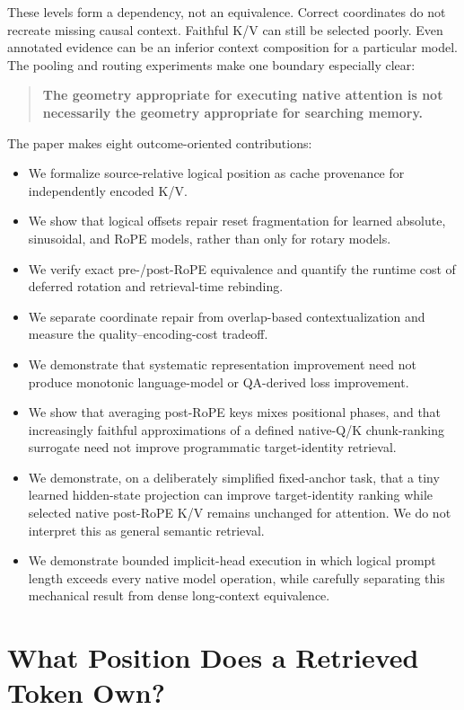 \documentclass[11pt]{article}
\begin{document}
These levels form a dependency, not an equivalence. Correct coordinates do not recreate
missing causal context. Faithful K/V can still be selected poorly. Even annotated evidence
can be an inferior context composition for a particular model. The pooling and routing
experiments make one boundary especially clear:

\begin{quote}
\textbf{The geometry appropriate for executing native attention is not necessarily the
geometry appropriate for searching memory.}
\end{quote}

The paper makes eight outcome-oriented contributions:
\begin{itemize}[leftmargin=*]
\item We formalize source-relative logical position as cache provenance for independently
encoded K/V.
\item We show that logical offsets repair reset fragmentation for learned absolute,
sinusoidal, and RoPE models, rather than only for rotary models.
\item We verify exact pre-/post-RoPE equivalence and quantify the runtime cost of deferred
rotation and retrieval-time rebinding.
\item We separate coordinate repair from overlap-based contextualization and measure the
quality--encoding-cost tradeoff.
\item We demonstrate that systematic representation improvement need not produce monotonic
language-model or QA-derived loss improvement.
\item We show that averaging post-RoPE keys mixes positional phases, and that increasingly
faithful approximations of a defined native-Q/K chunk-ranking surrogate need not improve
programmatic target-identity retrieval.
\item We demonstrate, on a deliberately simplified fixed-anchor task, that a tiny learned
hidden-state projection can improve target-identity ranking while selected native post-RoPE
K/V remains unchanged for attention. We do not interpret this as general semantic retrieval.
\item We demonstrate bounded implicit-head execution in which logical prompt length exceeds
every native model operation, while carefully separating this mechanical result from dense
long-context equivalence.
\end{itemize}

\section{What Position Does a Retrieved Token Own?}
\label{sec:example}
\end{document}
